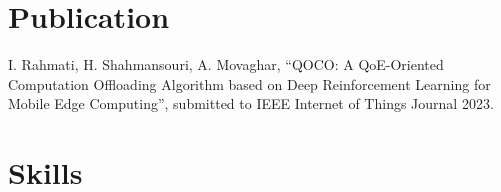 \documentclass[11pt]{article}
\begin{document}
\section {Publication}
 I. Rahmati, H. Shahmansouri, A. Movaghar, ``QOCO: A QoE-Oriented Computation Offloading Algorithm based on Deep Reinforcement Learning for Mobile Edge Computing'', submitted to IEEE Internet of Things Journal 2023.



\section{Skills}


\end{document}
